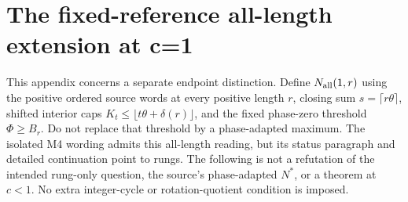 \documentclass[11pt,letterpaper]{article}
\begin{document}
\section{The fixed-reference all-length extension at c=1}\label{app:all-length}
This appendix concerns a separate endpoint distinction. Define $N_{\rm all}(1,r)$
using the positive ordered source words at every positive length $r$, closing sum
$s=\lceil r\theta\rceil$, shifted interior caps
$K_t\le\lfloor t\theta+\delta(r)\rfloor$, and the fixed phase-zero threshold
$\Phi\ge B_r$. Do not replace that threshold by a phase-adapted maximum.
The isolated M4 wording admits this all-length reading, but its status paragraph
and detailed continuation point to rungs. The following is not a refutation of
the intended rung-only question, the source's phase-adapted $N^*$, or a theorem
at $c<1$. No extra integer-cycle or rotation-quotient condition is imposed.
\end{document}

